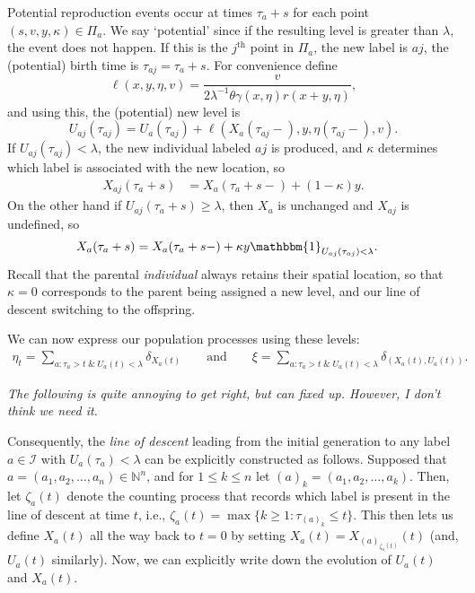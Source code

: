 \documentclass[12pt]{article}
\newcommand{\IN}{\mathbb N}
\newcommand{\lp}{\xi}              %
\newcommand{\labelspace}{\mathcal{I}} %
\newcommand{\comment}[1]{{\color{blue} \it #1}}
\begin{document}
Potential reproduction events occur at times $\tau_a + s$
for each point $(s, v, y, \kappa) \in \Pi_a$.
We say `potential' since if the resulting level is greater than $\lambda$,
the event does not happen.
If this is the $j^\text{th}$ point in $\Pi_a$,
the new label is $aj$, the (potential) birth time is $\tau_{aj} = \tau_a + s$.
For convenience define
$$
    \ell(x, y, \eta, v)
    =
    \frac{
        v
    }{
        2 \lambda^{-1} \theta \gamma(x, \eta) r(x + y, \eta)
    } ,
$$
and using this, the (potential) new level is
\begin{equation*}
    U_{aj}(\tau_{aj})
    =
    U_a(\tau_{aj})
    +
    \ell(X_a(\tau_{aj}-), y, \eta(\tau_{aj}-), v) .
\end{equation*}
If $U_{aj}(\tau_{aj}) < \lambda$,
the new individual labeled $aj$ is produced,
and $\kappa$ determines which label is associated with the new location,
so
\begin{align*}
    X_{aj}(\tau_a + s)
    &=
    X_a(\tau_a+s-) + (1 - \kappa) y .
\end{align*}
On the other hand
if $U_{aj}(\tau_a+s) \ge \lambda$, then $X_a$ is unchanged and $X_{aj}$ is undefined,
so
\begin{align} \label{eqn:X_line_of_descent}
    X_a(\tau_a+s)
    &=
    X_a(\tau_a+s-) + \kappa y \mathbbm{1}_{U_{aj}(\tau_{aj}) < \lambda} .
\end{align}
Recall that the parental \emph{individual} always retains their spatial location,
so that $\kappa = 0$ corresponds to the parent being assigned a new level,
and our line of descent switching to the offspring.

We can now express our population processes using these levels:
\begin{align*}
    \eta_t = \sum_{a : \tau_a > t \;\&\; U_a(t) < \lambda} \delta_{X_a(t)}
    \qquad \text{and} \qquad
    \lp = \sum_{a : \tau_a > t \;\&\; U_a(t) < \lambda} \delta_{(X_a(t), U_a(t))} .
\end{align*}

\comment{
    The following is quite annoying to get right, but can fixed up.
    However, I don't think we need it.}

Consequently, 
the \emph{line of descent}
leading from the initial generation
to any label $a \in \labelspace$
with $U_a(\tau_a) < \lambda$
can be explicitly constructed as follows.
Supposed that $a = (a_1, a_2, \ldots, a_n) \in \IN^n$,
and for $1 \le k \le n$ let $(a)_k = (a_1, a_2, \ldots, a_k)$.
Then, let $\zeta_a(t)$ denote the counting process that records
which label is present in the line of descent at time $t$,
i.e., $\zeta_a(t) = \max\{k \ge 1 : \tau_{(a)_k} \le t\}$.
This then lets us define $X_a(t)$ all the way back to $t=0$
by setting $X_a(t) = X_{(a)_{\zeta_a(t)}}(t)$ (and, $U_a(t)$ similarly).
Now, we can explicitly write down the evolution of $U_a(t)$ and $X_a(t)$.
\end{document}
